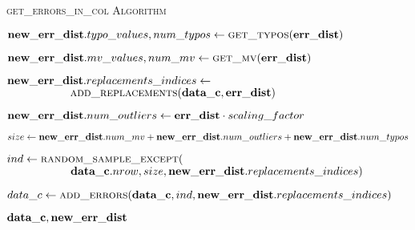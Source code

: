 \begin{algorithm}[!t]
    \caption{\textsc{get\_errors\_in\_col Algorithm}}\label{alg:local_get_errors_in_col}
    \begin{algorithmic}[1] 
	  
      \STATE $\mathbf{new\_err\_dist}.typo\_values, num\_typos \leftarrow \textsc{get\_typos}(\mathbf{err\_dist})$ 
	  
      \STATE $\mathbf{new\_err\_dist}.mv\_values, num\_mv \leftarrow \textsc{get\_mv}(\mathbf{err\_dist})$ 
      
      \STATE $\mathbf{new\_err\_dist}.replacements\_indices \leftarrow$
      \STATE $\ \ \ \ \ \ \ \ \ \ \ \ \ \ \ \ \ \textsc{add\_replacements}( \mat{data\_c},  \mat{err\_dist})$ 
      
      \STATE $\mathbf{new\_err\_dist}.num\_outliers \leftarrow \mathbf{err\_dist} \cdot scaling\_factor$ 
      
      \STATE $size \leftarrow \mathbf{new\_err\_dist}.num\_mv + \mathbf{new\_err\_dist}.num\_outliers + \mathbf{new\_err\_dist}.num\_typos$ 
      
      \STATE $ind \leftarrow \textsc{random\_sample\_except}($
      \STATE $\ \ \ \ \ \ \ \ \ \ \ \ \ \ \ \ \ \mat{data\_c}.nrow, size, \mat{new\_err\_dist}.replacements\_indices)$ 
      
	  \STATE $data\_c \leftarrow \textsc{add\_errors}(\mathbf{data\_c}, ind, \mathbf{new\_err\_dist}.replacements\_indices)$ 
      
      \RETURN $\mathbf{data\_c}, \mathbf{new\_err\_dist}$
    \end{algorithmic}
\end{algorithm}
